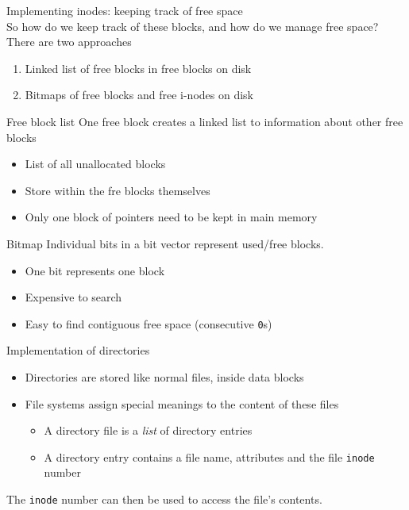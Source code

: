\documentclass[journal, letterpaper]{IEEEtran}
\begin{document}
\begin{aside}{Implementing inodes: keeping track of free space} \\
    So how do we keep track of these blocks, and how do we manage free space? There are two approaches
    \begin{enumerate}
        \item Linked list of free blocks in free blocks on disk
        \item Bitmaps of free blocks and free i-nodes on disk
    \end{enumerate}
    \begin{aside}{Free block list} One free block creates a linked list to information about other free blocks
        \begin{itemize}
            \item List of all unallocated blocks
            \item Store within the fre blocks themselves
            \item Only one block of pointers need to be kept in main memory
        \end{itemize}
    \end{aside}
    \begin{aside}{Bitmap} Individual bits in a bit vector represent used/free blocks.
        \begin{itemize}
            \item One bit represents one block
            \item Expensive to search
            \item Easy to find contiguous free space (consecutive \verb|0|s)
        \end{itemize}
    \end{aside}
\end{aside}
\begin{theory}{Implementation of directories} 
    \begin{itemize}
        \item Directories are stored like normal files, inside data blocks
        \item File systems assign special meanings to the content of these files
        \begin{itemize}
            \item A directory file is a \textit{list} of directory entries
            \item A directory entry contains a file name, attributes and the file \verb|inode| number
        \end{itemize}
    \end{itemize}
    The \verb|inode| number can then be used to access the file's contents.
\end{theory}
\end{document}
